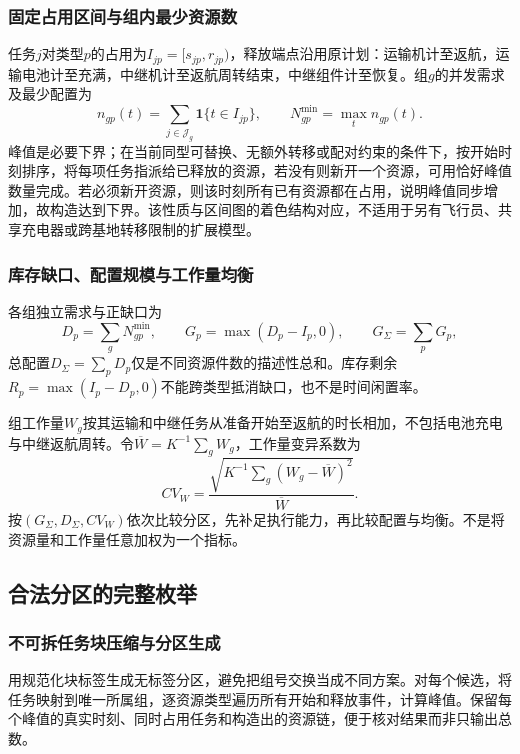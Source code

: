 \documentclass[withoutpreface,colorprint]{format}
\numberwithin{equation}{section}
\numberwithin{figure}{section}
\numberwithin{table}{section}
\begin{document}
\subsubsection{固定占用区间与组内最少资源数}
任务$j$对类型$p$的占用为$I_{jp}=[s_{jp},r_{jp})$，释放端点沿用原计划：运输机计至返航，运输电池计至充满，中继机计至返航周转结束，中继组件计至恢复。组$g$的并发需求及最少配置为
\begin{equation}
 n_{gp}(t)=\sum_{j\in\mathcal J_g}\mathbf1\{t\in I_{jp}\},\qquad
 N_{gp}^{\min}=\max_tn_{gp}(t).
\label{eq:q4_peak}
\end{equation}
峰值是必要下界；在当前同型可替换、无额外转移或配对约束的条件下，按开始时刻排序，将每项任务指派给已释放的资源，若没有则新开一个资源，可用恰好峰值数量完成。若必须新开资源，则该时刻所有已有资源都在占用，说明峰值同步增加，故构造达到下界。该性质与区间图的着色结构对应\cite{fulkerson1965interval}，不适用于另有飞行员、共享充电器或跨基地转移限制的扩展模型。

\subsubsection{库存缺口、配置规模与工作量均衡}
各组独立需求与正缺口为
\begin{equation}
 D_p=\sum_gN_{gp}^{\min},\qquad G_p=\max(D_p-I_p,0),\qquad
 G_\Sigma=\sum_pG_p,
\label{eq:q4_gap}
\end{equation}
总配置$D_\Sigma=\sum_pD_p$仅是不同资源件数的描述性总和。库存剩余$R_p=\max(I_p-D_p,0)$不能跨类型抵消缺口，也不是时间闲置率。

组工作量$W_g$按其运输和中继任务从准备开始至返航的时长相加，不包括电池充电与中继返航周转。令$\overline W=K^{-1}\sum_gW_g$，工作量变异系数为
\begin{equation}
 CV_W=\frac{\sqrt{K^{-1}\sum_g(W_g-\overline W)^2}}{\overline W}.
\label{eq:q4_cv}
\end{equation}
按$(G_\Sigma,D_\Sigma,CV_W)$依次比较分区，先补足执行能力，再比较配置与均衡。不是将资源量和工作量任意加权为一个指标。

\subsection{合法分区的完整枚举}
\subsubsection{不可拆任务块压缩与分区生成}
用规范化块标签生成无标签分区，避免把组号交换当成不同方案。对每个候选，将任务映射到唯一所属组，逐资源类型遍历所有开始和释放事件，计算峰值。保留每个峰值的真实时刻、同时占用任务和构造出的资源链，便于核对结果而非只输出总数。
\end{document}
